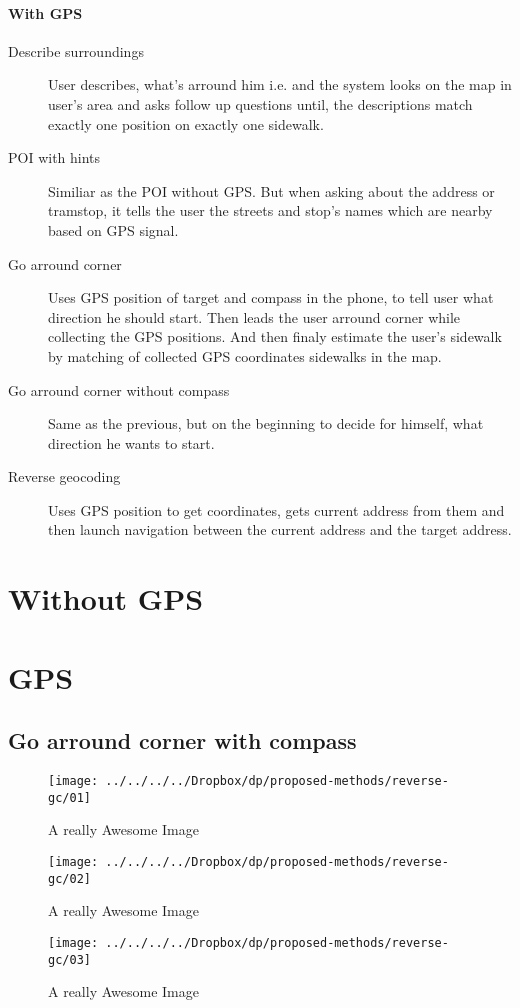 \documentclass[11pt,oneside,a4paper]{book}
\begin{document}
			\paragraph{With GPS}
				\begin{description}
					\item [Describe surroundings]
						User describes, what's arround him i.e.  and the system looks on the map in user's area and asks follow up questions until, the descriptions match exactly one position on exactly one sidewalk.								
					\item [POI with hints]
						Similiar as the POI without GPS. But when asking about the address or tramstop, it tells the user the streets and stop's names which are nearby based on GPS signal.
					\item [Go arround corner]
						Uses GPS position of target and compass in the phone, to tell user what direction he should start. Then leads the user arround corner while collecting the GPS positions. And then finaly estimate the user's sidewalk by matching of collected GPS coordinates sidewalks in the map.
					\item [Go arround corner without compass]
						Same as the previous, but on the beginning to decide for himself, what direction he wants to start.
					\item [Reverse geocoding]
						Uses GPS position to get coordinates, gets current address from them and then launch navigation between the current address and the target address.
				\end{description}
			
				
				
		\section{Without GPS}
		\section{GPS}
			\subsection{Go arround corner with compass}
				\begin{figure}[!htb]
					\texttt{[image: ../../../../Dropbox/dp/proposed-methods/reverse-gc/01]}
					\caption{A really Awesome Image}\label{fig:awesome_image1}
					\endminipage\hfill
					\texttt{[image: ../../../../Dropbox/dp/proposed-methods/reverse-gc/02]}
					\caption{A really Awesome Image}\label{fig:awesome_image2}
					\endminipage\hfill
					\texttt{[image: ../../../../Dropbox/dp/proposed-methods/reverse-gc/03]}
					\caption{A really Awesome Image}\label{fig:awesome_image3}
					\endminipage
				\end{figure}
			
\end{document}
